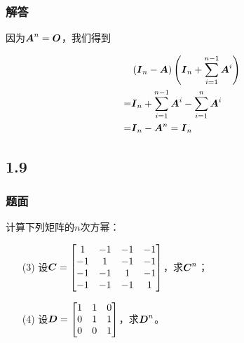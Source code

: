 \documentclass{beamer}
\begin{document}
\begin{frame}
\frametitle{解答}

    因为\(\boldsymbol{A}^n=\boldsymbol{O}\)，我们得到

    \begin{align*}
          & \left( \boldsymbol{I}_n-\boldsymbol{A} \right)\left( \boldsymbol{I}_n+\sum_{i=1}^{n-1}\boldsymbol{A}^i \right) \\
        = & \boldsymbol{I}_n+\sum_{i=1}^{n-1}\boldsymbol{A}^i-\sum_{i=1}^n\boldsymbol{A}^i          \\
        = & \boldsymbol{I}_n-\boldsymbol{A}^n=\boldsymbol{I}_n
    \end{align*}

\end{frame}

\subsection*{1.9}

\begin{frame}
    \frametitle{题面}

    计算下列矩阵的\(n\)次方幂：

    \begin{enumerate}
        \item[(3)] 设\(\boldsymbol{C}=\begin{bmatrix}1&-1&-1&-1\\-1&1&-1&-1\\-1&-1&1&-1\\-1&-1&-1&1\end{bmatrix}\)，求\(\boldsymbol{C}^n\)；
        \item[(4)] 设\(\boldsymbol{D}=\begin{bmatrix}1&1&0\\0&1&1\\0&0&1\end{bmatrix}\)，求\(\boldsymbol{D}^n\)。
    \end{enumerate}

\end{frame}
\end{document}
